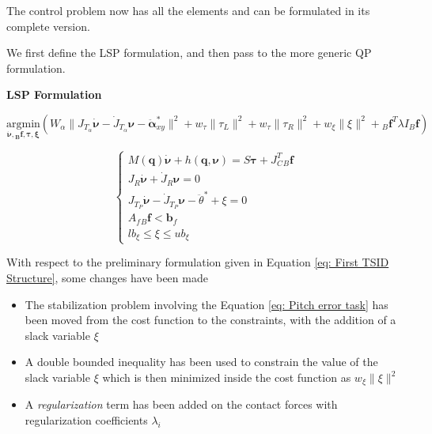 The control problem now has all the elements and can be formulated in its complete version.

We first define the LSP formulation, and then pass to the more generic QP formulation.
\vspace{12pt}
\begin{center}
{\large \textbf{LSP Formulation}}
\end{center}

\begin{center}
$\underset{\bm{\dot{\nu},{}_{B}\mathbf{f},\bm{\tau}}, \bm{\xi}}{\text{argmin}} (W_{\alpha}\|J_{T_{\alpha}}{\dot{\bm{\nu}}} - \dot{J}_{T_{\alpha}}\bm{\nu} - \ddot{\bm{\alpha}}_{xy}^{*}\|^{2} + w_{\tau}\| \tau_L \|^{2} + w_{\tau}\| \tau_R \|^{2} + w_{\xi} \| \xi \|^{2} + {}_{B}\mathbf{f}^{T} \lambda I {}_{B}\mathbf{f})$


\end{center}

\begin{equation}
\begin{cases}
        M(\mathbf{q})\dot{\bm{\nu}} + h(\mathbf{q},\bm{\nu}) = S\bm{\tau} + J^{T}_{C} {}_{B}\mathbf{f} \\
        J_{R}\bm{\dot{\nu}} + \dot{J}_R\bm{\nu} = 0 \\
        J_{T_P}{\dot{\bm{\nu}}} - \dot{J}_{T_P}\bm{\nu} - \ddot{\theta}^{*} + \xi = 0 \\
        A_{f}{}_{B}\mathbf{f} < \mathbf{b}_{f} \\
        lb_{\xi} \leq \xi \leq ub_{\xi}
\end{cases}
\label{eq: LSP Formulation}
\end{equation}

With respect to the preliminary formulation given in Equation \eqref{eq: First TSID Structure}, some changes have been made

\begin{itemize}
    \item The stabilization problem involving the Equation \eqref{eq: Pitch error task} has been moved from the cost function to the constraints, with the addition of a slack variable $\xi$
    \item A double bounded inequality has been used to constrain the value of the slack variable $\xi$ which is then minimized inside the cost function as $w_{\xi} \| \xi \|^{2}$
    \item A \textit{regularization} term has been added on the contact forces with regularization coefficients $\lambda_{i}$ 
\end{itemize}

